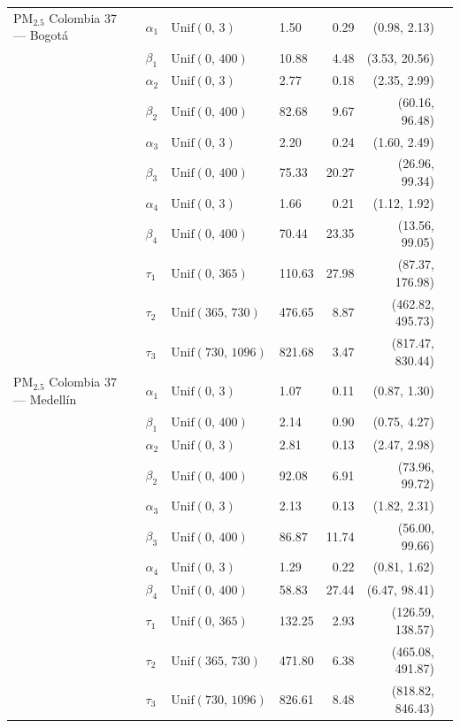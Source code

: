 \begin{longtable}{llllrrr}
PM$_{2.5}$ Colombia 37 --- Bogot\'{a} & $\alpha_{1}$ & $\text{Unif}(0,\,3)$ & 1.50 & 0.29 & (0.98, 2.13) \\
 & $\beta_{1}$ & $\text{Unif}(0,\,400)$ & 10.88 & 4.48 & (3.53, 20.56) \\
 & $\alpha_{2}$ & $\text{Unif}(0,\,3)$ & 2.77 & 0.18 & (2.35, 2.99) \\
 & $\beta_{2}$ & $\text{Unif}(0,\,400)$ & 82.68 & 9.67 & (60.16, 96.48) \\
 & $\alpha_{3}$ & $\text{Unif}(0,\,3)$ & 2.20 & 0.24 & (1.60, 2.49) \\
 & $\beta_{3}$ & $\text{Unif}(0,\,400)$ & 75.33 & 20.27 & (26.96, 99.34) \\
 & $\alpha_{4}$ & $\text{Unif}(0,\,3)$ & 1.66 & 0.21 & (1.12, 1.92) \\
 & $\beta_{4}$ & $\text{Unif}(0,\,400)$ & 70.44 & 23.35 & (13.56, 99.05) \\
 & $\tau_{1}$ & $\text{Unif}(0,\,365)$ & 110.63 & 27.98 & (87.37, 176.98) \\
 & $\tau_{2}$ & $\text{Unif}(365,\,730)$ & 476.65 & 8.87 & (462.82, 495.73) \\
 & $\tau_{3}$ & $\text{Unif}(730,\,1096)$ & 821.68 & 3.47 & (817.47, 830.44) \\
\midrule
PM$_{2.5}$ Colombia 37 --- Medell\'{i}n & $\alpha_{1}$ & $\text{Unif}(0,\,3)$ & 1.07 & 0.11 & (0.87, 1.30) \\
 & $\beta_{1}$ & $\text{Unif}(0,\,400)$ & 2.14 & 0.90 & (0.75, 4.27) \\
 & $\alpha_{2}$ & $\text{Unif}(0,\,3)$ & 2.81 & 0.13 & (2.47, 2.98) \\
 & $\beta_{2}$ & $\text{Unif}(0,\,400)$ & 92.08 & 6.91 & (73.96, 99.72) \\
 & $\alpha_{3}$ & $\text{Unif}(0,\,3)$ & 2.13 & 0.13 & (1.82, 2.31) \\
 & $\beta_{3}$ & $\text{Unif}(0,\,400)$ & 86.87 & 11.74 & (56.00, 99.66) \\
 & $\alpha_{4}$ & $\text{Unif}(0,\,3)$ & 1.29 & 0.22 & (0.81, 1.62) \\
 & $\beta_{4}$ & $\text{Unif}(0,\,400)$ & 58.83 & 27.44 & (6.47, 98.41) \\
 & $\tau_{1}$ & $\text{Unif}(0,\,365)$ & 132.25 & 2.93 & (126.59, 138.57) \\
 & $\tau_{2}$ & $\text{Unif}(365,\,730)$ & 471.80 & 6.38 & (465.08, 491.87) \\
 & $\tau_{3}$ & $\text{Unif}(730,\,1096)$ & 826.61 & 8.48 & (818.82, 846.43) \\

\end{longtable}
